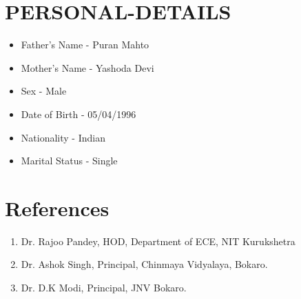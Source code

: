 \documentclass[11pt,a4paper,sans]{moderncv}
\begin{document}
\section{PERSONAL-DETAILS}
\begin{itemize}
\item Father's Name - Puran Mahto
\item Mother's Name - Yashoda Devi
\item Sex - Male
\item Date of Birth - 05/04/1996
\item Nationality - Indian
\item Marital Status - Single
\end{itemize}
\section{References}
\begin{enumerate}
\item Dr. Rajoo Pandey, HOD, Department of ECE, NIT Kurukshetra
\item Dr. Ashok Singh, Principal, Chinmaya Vidyalaya, Bokaro.
\item Dr. D.K Modi, Principal, JNV Bokaro.
\end{enumerate}




\clearpage
\end{document}
